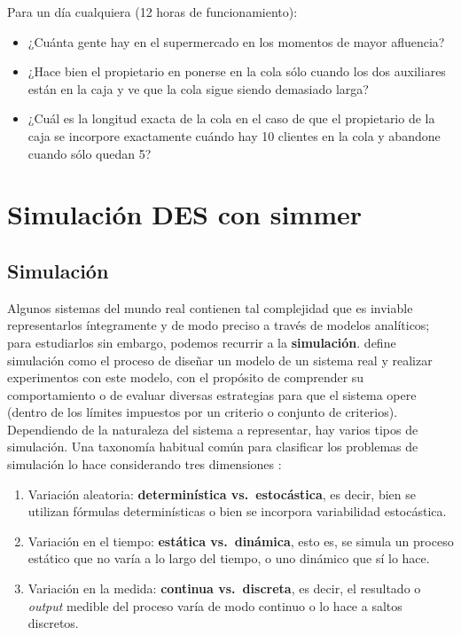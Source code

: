 \documentclass[
]{book}
\providecommand{\tightlist}{%
  \setlength{\itemsep}{0pt}\setlength{\parskip}{0pt}}
\theoremstyle{definition}
\theoremstyle{definition}
\theoremstyle{definition}
\theoremstyle{definition}
\theoremstyle{remark}
\begin{document}
Para un día cualquiera (12 horas de funcionamiento):

\begin{itemize}
\tightlist
\item
  ¿Cuánta gente hay en el supermercado en los momentos de mayor afluencia?
\item
  ¿Hace bien el propietario en ponerse en la cola sólo cuando los dos auxiliares están en la caja y ve que la cola sigue siendo demasiado larga?
\item
  ¿Cuál es la longitud exacta de la cola en el caso de que el propietario de la caja se incorpore exactamente cuándo hay 10 clientes en la cola y abandone cuando sólo quedan 5?
\end{itemize}

\hypertarget{simmerunidad}{%
\chapter{Simulación DES con simmer}\label{simmerunidad}}

\hypertarget{simulaciuxf3n-1}{%
\section{Simulación}\label{simulaciuxf3n-1}}

Algunos sistemas del mundo real contienen tal complejidad que es inviable representarlos íntegramente y de modo preciso a través de modelos analíticos; para estudiarlos sin embargo, podemos recurrir a la \textbf{simulación}. \citet{shannon} define simulación como el proceso de diseñar un modelo de un sistema real y realizar experimentos con este modelo, con el propósito de comprender su comportamiento o de evaluar diversas estrategias para que el sistema opere (dentro de los límites impuestos por un criterio o conjunto de criterios).
Dependiendo de la naturaleza del sistema a representar, hay varios tipos de simulación. Una taxonomía habitual común para clasificar los problemas de simulación lo hace considerando tres dimensiones \citep{lawkelton}:

\begin{enumerate}
\def\labelenumi{\arabic{enumi}.}
\tightlist
\item
  Variación aleatoria: \textbf{determinística vs.~estocástica}, es decir, bien se utilizan fórmulas determinísticas o bien se incorpora variabilidad estocástica.
\item
  Variación en el tiempo: \textbf{estática vs.~dinámica}, esto es, se simula un proceso estático que no varía a lo largo del tiempo, o uno dinámico que sí lo hace.
\item
  Variación en la medida: \textbf{continua vs.~discreta}, es decir, el resultado o \emph{output} medible del proceso varía de modo continuo o lo hace a saltos discretos.
\end{enumerate}
\end{document}
